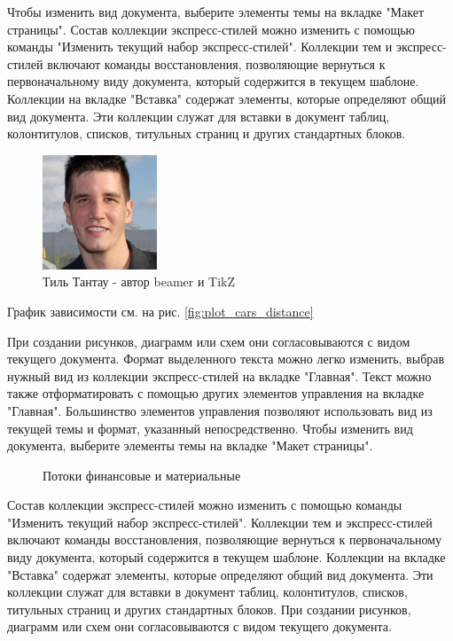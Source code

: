 \documentclass{article}
\begin{document}
Чтобы изменить вид документа, выберите элементы темы на вкладке "Макет страницы". Состав коллекции экспресс-стилей можно изменить с помощью команды "Изменить текущий набор экспресс-стилей". Коллекции тем и экспресс-стилей включают команды восстановления, позволяющие вернуться к первоначальному виду документа, который содержится в текущем шаблоне. Коллекции на вкладке "Вставка" содержат элементы, которые определяют общий вид документа. Эти коллекции служат для вставки в документ таблиц, колонтитулов, списков, титульных страниц и других стандартных блоков.
\begin{figure}
    \includegraphics[width=0.4\linewidth]{tantau_129.jpg}
    \caption[Тантау]{Тиль Тантау - автор beamer и TikZ}
    \label{fig:4936_Tantau2}
\end{figure}

График зависимости см. на рис. \ref{fig:plot_cars_distance}

При создании рисунков, диаграмм или схем они согласовываются с видом текущего документа. Формат выделенного текста можно легко изменить, выбрав нужный вид из коллекции экспресс-стилей на вкладке "Главная". Текст можно также отформатировать с помощью других элементов управления на вкладке "Главная". Большинство элементов управления позволяют использовать вид из текущей темы и формат, указанный непосредственно. Чтобы изменить вид документа, выберите элементы темы на вкладке "Макет страницы".

\begin{figure}[h]
\centering	

\caption{Потоки финансовые и материальные}
\end{figure}


Состав коллекции экспресс-стилей можно изменить с помощью команды "Изменить текущий набор экспресс-стилей". Коллекции тем и экспресс-стилей включают команды восстановления, позволяющие вернуться к первоначальному виду документа, который содержится в текущем шаблоне. Коллекции на вкладке "Вставка" содержат элементы, которые определяют общий вид документа. Эти коллекции служат для вставки в документ таблиц, колонтитулов, списков, титульных страниц и других стандартных блоков. При создании рисунков, диаграмм или схем они согласовываются с видом текущего документа.
\end{document}
